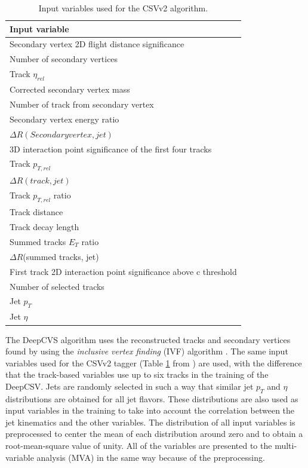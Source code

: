 \begin{table}[htbp]
    \caption{Input variables used for the CSVv2 algorithm.}
    \centering
    \begin{tabular}{l}
        \hline
        Input variable                                            \\ 
        \hline 
        Secondary vertex 2D flight distance significance\\
        Number of secondary vertices\\
        Track $\eta_{rel}$\\
        Corrected secondary vertex mass\\
        Number of track from secondary vertex\\
        Secondary vertex energy ratio\\
        $\Delta R (Secondary vertex, jet)$ \\
        3D interaction point significance of the first four tracks\\
        Track $p_{T,rel}$\\
        $\Delta R (track, jet)$ \\
        Track $p_{T,rel}$ ratio\\
        Track distance\\
        Track decay length\\
        Summed tracks $E_{T}$ ratio\\
        $\Delta R$(summed tracks, jet)\\
        First track 2D interaction point significance above c threshold\\
        Number of selected tracks\\
        Jet $p_{T}$\\
        Jet $\eta$\\
        \hline 
    \end{tabular}
    \label{tab:csvv2var}
\end{table}

The DeepCVS algorithm uses the reconstructed tracks and secondary vertices found by using the \textit{inclusive vertex finding} (IVF) algorithm \cite{ADAM2007781}. The same input variables used for the CSVv2 tagger (Table \ref{tab:csvv2var} from \cite{Sirunyan_2018}) are used, with the difference that the track-based variables use up to six tracks in the training of the DeepCSV. Jets are randomly selected in such a way that similar jet $p_{T}$ and $\eta$ distributions are obtained for all jet flavors. These distributions are also used as input variables in the training to take into account the correlation between the jet kinematics and the other variables. The distribution of all input variables is preprocessed to center the mean of each distribution around zero and to obtain a root-mean-square value of unity. All of the variables are presented to the multi-variable analysis (MVA) in the same way because of the preprocessing.

